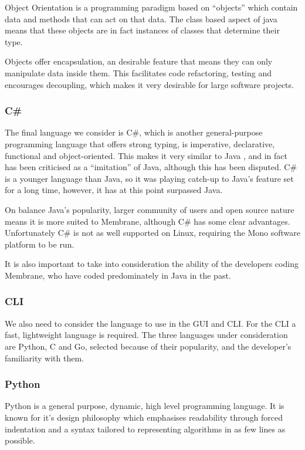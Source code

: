 \documentclass[11pt, a4paper, twoside]{report}
\begin{document}
Object Orientation is a programming paradigm based on ``objects'' which contain data and methods that can act on that data. The class based aspect of java means that these objects are in fact instances of classes that determine their type. \citep{kindler2011object}

Objects offer encapsulation, an desirable feature that means they can only manipulate data inside them. This facilitates code refactoring, testing and encourages decoupling, which makes it very desirable for large software projects.

\subsubsection{C\#}

The final language we consider is C\#, which is another general-purpose programming language that offers strong typing, is imperative, declarative, functional and object-oriented. This makes it very similar to Java \citep{kreft2017afterjava}, and in fact has been criticised as a ``imitation'' of Java, although this has been disputed. C\# is a younger language than Java, so it was playing catch-up to Java's feature set for a long time, however, it has at this point surpassed Java.

On balance Java's popularity, larger community of users and open source nature means it is more suited to Membrane, although C\# has some clear advantages. Unfortunately C\# is not as well supported on Linux, requiring the Mono software platform to be run.

It is also important to take into consideration the ability of the developers coding Membrane, who have coded predominately in Java in the past.

\subsubsection{CLI}

We also need to consider the language to use in the GUI and CLI. For the CLI a fast, lightweight language is required. The three languages under consideration are Python, C and Go, selected because of their popularity, and the developer's familiarity with them.

\subsubsection{Python}

Python is a general purpose, dynamic, high level programming language. It is known for it's design philosophy which emphasises readability through forced indentation and a syntax tailored to representing algorithms in as few lines as possible.
\end{document}

